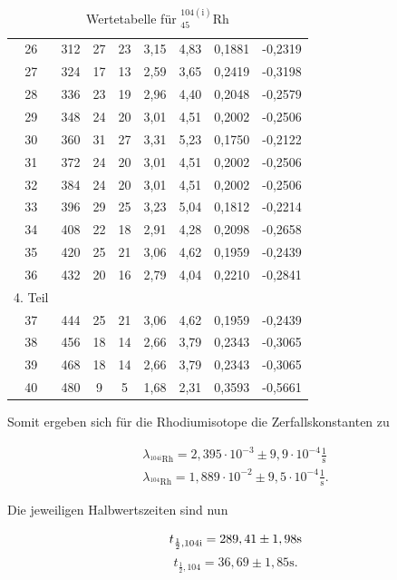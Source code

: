 \begin{table}[H]
\begin{tabular}{c|c|c|c|c|c|c|c}
26&	312&	27&	23&	3,15&	4,83&	0,1881&	-0,2319\\
27&	324&	17&	13&	2,59&	3,65&	0,2419&	-0,3198\\
28&	336&	23&	19&	2,96&	4,40&	0,2048&	-0,2579\\
29&	348&	24&	20&	3,01&	4,51&	0,2002&	-0,2506\\
30&	360&	31&	27&	3,31&	5,23&	0,1750&	-0,2122\\
31&	372&	24&	20&	3,01&	4,51&	0,2002&	-0,2506\\
32&	384&	24&	20&	3,01&	4,51&	0,2002&	-0,2506\\
33&	396&	29&	25&	3,23&	5,04&	0,1812&	-0,2214\\
34&	408&	22&	18&	2,91&	4,28&	0,2098&	-0,2658\\
35&	420&	25&	21&	3,06&	4,62&	0,1959&	-0,2439\\
36&	432&	20&	16&	2,79&	4,04&	0,2210&	-0,2841\\
\hline
4. Teil \\
\hline
37&	444&	25&	21&	3,06&	4,62&	0,1959&	-0,2439\\
38&	456&	18&	14&	2,66&	3,79&	0,2343&	-0,3065\\
39&	468&	18&	14&	2,66&	3,79&	0,2343&	-0,3065\\
40&	480&	9&	5&	1,68&	2,31&	0,3593&	-0,5661\\

\end{tabular}
\caption{Wertetabelle für $^{104(\text{i})}_{45}$Rh}
\label{tabrhod}
\end{table}
\renewcommand{\arraystretch}{1}

Somit ergeben sich für die Rhodiumisotope die Zerfallskonstanten zu

\begin{align}
\lambda_{^{104\text{i}}\text{Rh}} = 2,395\cdot 10^{-3} \pm 9,9 \cdot 10^{-4} \frac{1}{\text{s}}\\
\lambda_{^{104}\text{Rh}} = 1,889 \cdot 10^{-2} \pm  9,5 \cdot 10^{-4} \frac{1}{\text{s}}.
\end{align}

Die jeweiligen Halbwertszeiten sind nun

\begin{equation}
   t_{\frac12,\text{104i}} = 289,41 \pm 1,98 \text{s}\\
\label{rh1}
\end{equation}
\begin{equation}
 t_{\frac12,\text{104}} = 36,69 \pm 1,85 \text{s}.
 \label{rh2}
\end{equation}

